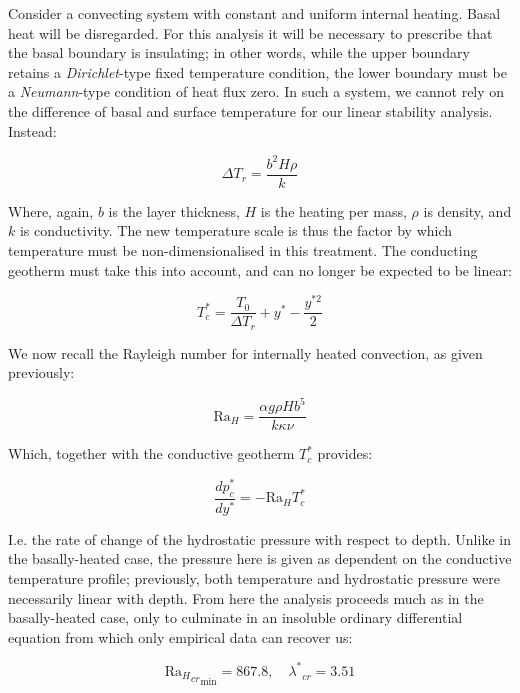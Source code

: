 \documentclass[a4paper,11pt,oneside]{book}
\begin{document}
Consider a convecting system with constant and uniform internal heating. Basal heat will be disregarded. For this analysis it will be necessary to prescribe that the basal boundary is insulating; in other words, while the upper boundary retains a \textit{Dirichlet}-type fixed temperature condition, the lower boundary must be a \textit{Neumann}-type condition of heat flux zero. In such a system, we cannot rely on the difference of basal and surface temperature for our linear stability analysis. Instead:

\begin{equation}
\Delta T_r = \frac{b^2 H \rho}{k}
\end{equation}

Where, again, $b$ is the layer thickness, $H$ is the heating per mass, $\rho$ is density, and $k$ is conductivity. The new temperature scale is thus the factor by which temperature must be non-dimensionalised in this treatment. The conducting geotherm must take this into account, and can no longer be expected to be linear:

\begin{equation}
T_c^* = \frac{T_0}{\Delta T_r} + y^* - \frac{y^{*2}}{2}
\end{equation}

We now recall the Rayleigh number for internally heated convection, as given previously:

\begin{equation}
\mathrm{Ra}_H = \frac{\alpha g \rho H b^5}{k \kappa \nu}
\end{equation}

Which, together with the conductive geotherm $T_c^*$ provides:

\begin{equation}
\frac{d p_c^*}{d y^*} = -\mathrm{Ra}_H T_c^*
\end{equation}

I.e. the rate of change of the hydrostatic pressure with respect to depth. Unlike in the basally-heated case, the pressure here is given as dependent on the conductive temperature profile; previously, both temperature and hydrostatic pressure were necessarily linear with depth. From here the analysis proceeds much as in the basally-heated case, only to culminate in an insoluble ordinary differential equation \cite{Schubert2001-ea} from which only empirical data can recover us:

\begin{equation}
{{\mathrm{Ra}_{H}}_{cr}}_{\min} = 867.8, \quad {\lambda^{*}}_{cr} = 3.51
\end{equation}
\end{document}
